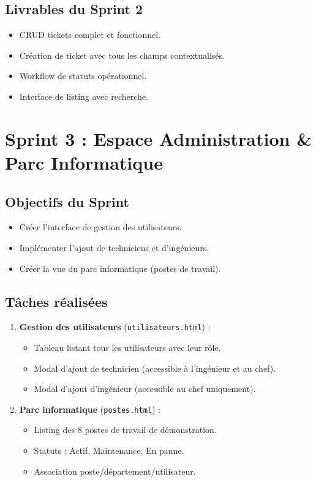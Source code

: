 \documentclass[12pt,a4paper,twoside]{report}
\begin{document}
\subsection{Livrables du Sprint 2}

\begin{itemize}
    \item CRUD tickets complet et fonctionnel.
    \item Création de ticket avec tous les champs contextualisés.
    \item Workflow de statuts opérationnel.
    \item Interface de listing avec recherche.
\end{itemize}

\section{Sprint 3 : Espace Administration \& Parc Informatique}

\subsection{Objectifs du Sprint}

\begin{itemize}
    \item Créer l'interface de gestion des utilisateurs.
    \item Implémenter l'ajout de techniciens et d'ingénieurs.
    \item Créer la vue du parc informatique (postes de travail).
\end{itemize}

\subsection{Tâches réalisées}

\begin{enumerate}
    \item \textbf{Gestion des utilisateurs} (\texttt{utilisateurs.html}) :
    \begin{itemize}
        \item Tableau listant tous les utilisateurs avec leur rôle.
        \item Modal d'ajout de technicien (accessible à l'ingénieur et au chef).
        \item Modal d'ajout d'ingénieur (accessible au chef uniquement).
    \end{itemize}
    \item \textbf{Parc informatique} (\texttt{postes.html}) :
    \begin{itemize}
        \item Listing des 8 postes de travail de démonstration.
        \item Statuts : Actif, Maintenance, En panne.
        \item Association poste/département/utilisateur.
    \end{itemize}
\end{enumerate}
\end{document}
